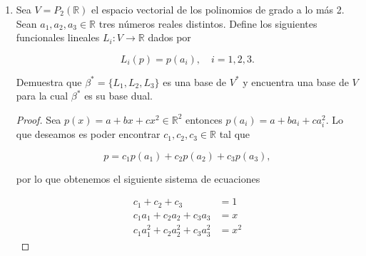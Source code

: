 \documentclass[letterpaper]{article}
\theoremstyle{definition}
\theoremstyle{lemathm}
\theoremstyle{lemademthm}
\newcommand{\R}{\mathbb{R}}
\begin{document}
\begin{enumerate}
\begin{proof}
			en esta última matriz podemos ver que el primero y el segundo renglón son independientes mientras que el último y el segundo no lo son, por lo tanto el rango de la matriz de coeficientes es 2.

			Analogamente para la matriz aumentada obtenemos

			\begin{align*}
				\begin{pmatrix}
					1 & -2 & 1 & 2 & 1\\
					1 & 1 & -1 & 1 & 2\\
					1 & 7 & -5 & -1 & 3\\
				\end{pmatrix}
				&& \rightarrow
				\begin{pmatrix}
					1 & -2 & 1 & 2 & 1\\
					0 & 3 & -2 & -1 & \frac{1}{3}\\
					0 & 3 & -2 & -1 & \frac{2}{9}\\
				\end{pmatrix}
			\end{align*}


			en esta última matriz todos los renglonnes son independientes por lo que el rango de la matriz aumentada es 3.

			Por el teorema 3. concluimos que el sistema de ecuaciones es inconsistente.

		\end{proof}

		\item Sea $V = P_2(\R)$ el espacio vectorial de los polinomios de grado a lo más 2. Sean $a_1, a_2, a_3 \in \R$ tres números reales distintos. Define los siguientes funcionales lineales $L_i : V \rightarrow \R$ dados por
		
		\[L_i(p) = p(a_i), \quad i = 1,2,3.\]

		Demuestra que $\beta^* = \{L_1,L_2,L_3\}$ es una base de $V^*$ y encuentra una base de $V$ para la cual $\beta^*$ es su base dual.

		\begin{proof}
			Sea $p(x) = a + bx + cx^2 \in \R^2$ entonces $p(a_i) = a + ba_i + ca_i^2$. Lo que deseamos es poder encontrar $c_1,c_2,c_3\in\R$ tal que

			\[p = c_1p(a_1) + c_2p(a_2) + c_3p(a_3),\]

			por lo que obtenemos el siguiente sistema de ecuaciones

			\begin{align*}
				c_1 + c_2 + c_3 &= 1\\
				c_1a_1 + c_2a_2 + c_3a_3 &= x\\
				c_1a_1^2 + c_2a_2^2 + c_3a_3^2 &= x^2 
			\end{align*}


\end{proof}
\end{enumerate}
\end{document}
